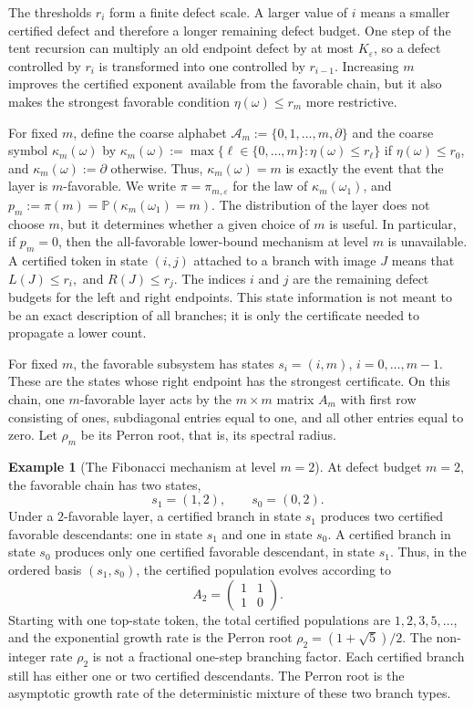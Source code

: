 \documentclass[11pt]{amsart}
\numberwithin{equation}{section}
\theoremstyle{plain}
\theoremstyle{definition}
\newtheorem{example}{Example}[section]
\theoremstyle{remark}
\begin{document}
The thresholds \(r_i\) form a finite defect scale. A larger value of \(i\) means a smaller certified defect and therefore a longer remaining defect budget. One step of the tent recursion can multiply an old endpoint defect by at most \(K_\varepsilon\), so a defect controlled by \(r_i\) is transformed into one controlled by \(r_{i-1}\). Increasing \(m\) improves the certified exponent available from the favorable chain, but it also makes the strongest favorable condition \(\eta(\omega)\le r_m\) more restrictive.

For fixed \(m\), define the coarse alphabet \(\mathcal A_m:=\{0,1,\dots,m,\partial\}\) and the coarse symbol \(\kappa_m(\omega)\) by \(\kappa_m(\omega):=\max\{\ell\in\{0,\dots,m\}:\eta(\omega)\le r_\ell\}\) if \(\eta(\omega)\le r_0\), and \(\kappa_m(\omega):=\partial\) otherwise. Thus, \(\kappa_m(\omega)=m\) is exactly the event that the layer is \(m\)-favorable. We write \(\pi=\pi_{m,\varepsilon}\) for the law of \(\kappa_m(\omega_1)\), and \(p_m:=\pi(m)=\mathbb P(\kappa_m(\omega_1)=m)\). The distribution of the layer does not choose \(m\), but it determines whether a given choice of \(m\) is useful. In particular, if \(p_m=0\), then the all-favorable lower-bound mechanism at level \(m\) is unavailable.
A certified token in state \((i,j)\) attached to a branch with image \(J\) means that
\(
L(J)\le r_i,
\)
and
\(
R(J)\le r_j.
\)
The indices \(i\) and \(j\) are the remaining defect budgets for the left and right endpoints. This state information is not meant to be an exact description of all branches; it is only the certificate needed to propagate a lower count.


For fixed \(m\), the favorable subsystem has states \(s_i=(i,m)\), \(i=0,\dots,m-1\). These are the states whose right endpoint has the strongest certificate. On this chain, one \(m\)-favorable layer acts by the \(m\times m\) matrix \(A_m\) with first row consisting of ones, subdiagonal entries equal to one, and all other entries equal to zero. Let \(\rho_m\) be its Perron root, that is, its spectral radius.

\begin{example}[The Fibonacci mechanism at level \(m=2\)]\label{ex:fibonacci-level-two}
At defect budget \(m=2\), the favorable chain has two states,
\[
s_1=(1,2),
\qquad
s_0=(0,2).
\]
Under a \(2\)-favorable layer, a certified branch in state \(s_1\) produces two certified favorable descendants: one in state \(s_1\) and one in state \(s_0\). A certified branch in state \(s_0\) produces only one certified favorable descendant, in state \(s_1\). Thus, in the ordered basis \((s_1,s_0)\), the certified population evolves according to
\[
A_2=
\begin{pmatrix}
1&1\\
1&0
\end{pmatrix}.
\]
Starting with one top-state token, the total certified populations are \(1,2,3,5,\dots\), and the exponential growth rate is the Perron root \(\rho_2=(1+\sqrt{5})/2\). The non-integer rate \(\rho_2\) is not a fractional one-step branching factor. Each certified branch still has either one or two certified descendants. The Perron root is the asymptotic growth rate of the deterministic mixture of these two branch types.
\end{example}
\end{document}
